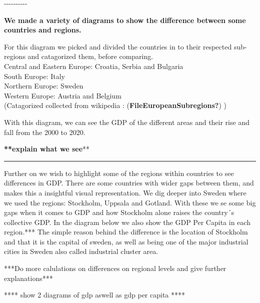 \documentclass[
  a4paper,
  DIV=11,
  numbers=noendperiod]{scrartcl}
\begin{document}
-\/-\/-\/-\/-\/-\/-\/-\/-\/-

\textbf{We made a variety of diagrams to show the difference between
some countries and regions.}

For this diagram we picked and divided the countries in to their
respected sub-regions and catagorized them, before comparing.\\

Central and Eastern Europe: Croatia, Serbia and Bulgaria\\

South Europe: Italy\\

Northern Europe: Sweden\\

Western Europe: Austria and Belgium\\

(Catagorized collected from wikipedia :
(\textbf{FileEuropeanSubregions?}) )

With this diagram, we can see the GDP of the different areas and their
rise and fall from the 2000 to 2020.

\textbf{**explain what we see}**\\

\begin{center}\rule{0.5\linewidth}{0.5pt}\end{center}

Further on we wish to highlight some of the regions within countries to
see differences in GDP. There are some countries with wider gaps between
them, and makes this a insightful visual representation. We dig deeper
into Sweden where we used the regions: Stockholm, Uppsala and Gotland.
With these we se some big gaps when it comes to GDP and how Stockholm
alone raises the country´s collective GDP. In the diagram below we also
show the GDP Per Capita in each region.*** The simple reason behind the
difference is the location of Stockholm and that it is the capital of
sweden, as well as being one of the major industrial cities in Sweden
also called industrial cluster area.

***Do more calulations on differences on regional levels and give
further explanations***\\

\hfill\break

**** show 2 diagrams of gdp aswell as gdp per capita ****
\end{document}
